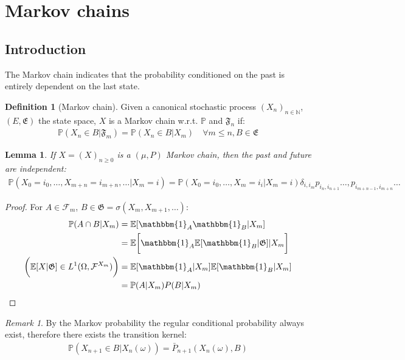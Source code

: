 \documentclass[a4paper,11pt]{book}
\newtheorem{lemma}[theorem]{Lemma}
\theoremstyle{definition}
\newtheorem{definition}{Definition}[section]
\theoremstyle{remark}
\newtheorem*{remark}{Remark}
\begin{document}
 
 
 
 \newpage
 \section{Markov chains}
 \subsection{Introduction}
 The Markov chain indicates that the probability conditioned on the past is entirely dependent on the last state. 
 \begin{definition}[Markov chain]
 Given a canonical stochastic process $(X_n)_{n \in \mathbb{N}}$, $(E, \mathfrak{E})$ the state space, $X$ is a Markov chain w.r.t. $\mathbb{P}$ and $\mathfrak{F}_n$ if:
 \begin{align*}
 	\mathbb{P}(X_n\in B | \mathfrak{F}_m) = \mathbb{P}(X_n \in B|X_{m}) \quad \forall m \le n, B \in \mathfrak{E}
 \end{align*}
 \end{definition}
 
 \begin{lemma}
 	If $X = (X)_{n \geq 0}$ is a $(\mu, P)$ Markov chain, then the past and future are independent:
 	\begin{align*}
 		\mathbb{P}(X_0 = i_0, \dots, X_{m+n} = i_{m+n}, \dots|X_m = i) = \mathbb{P}(X_0 = i_0, \dots,X_m = i_i |X_m = i)\delta_{i,i_m} p_{i_n, i_{n+1}}\dots, p_{i_{m+n-1}, i_{m+n}}\dots
 	\end{align*}
 \end{lemma}
  \begin{proof}
 For $A \in \mathcal{F}_m$, $B \in \mathfrak{G} = \sigma(X_m, X_{m+1}, \dots)$:
 \begin{align*}
 	\mathbb{P}(A \cap B|X_m) &= \mathbb{E}[\mathbbm{1}_{A} \mathbbm{1}_{B}|X_m]\\
 	&= \mathbb{E}\bigg[\mathbbm{1}_{A}\mathbb{E}[\mathbbm{1}_{B}|\mathfrak{G}]|X_m\bigg]\\
 \bigg(\mathbb{E}[X|\mathfrak{G}]\in L^1(\Omega, \mathcal{F}^{X_m})\bigg)
  	&= \mathbb{E}[\mathbbm{1}_{A}|X_m] \mathbb{E}[\mathbbm{1}_{B}|X_m]\\
 	&= \mathbb{P}(A|X_m) P(B|X_m)
 \end{align*}
\end{proof}
 
\begin{remark} By the Markov probability the regular conditional probability always exist, therefore there exists the transition kernel:
 \begin{align*}
 	\mathbb{P}(X_{n+1} \in B | X_n(\omega)) =  \bar{P}_{n+1}(X_n(\omega), B)
 \end{align*}
 \end{remark}
 
\end{document}
